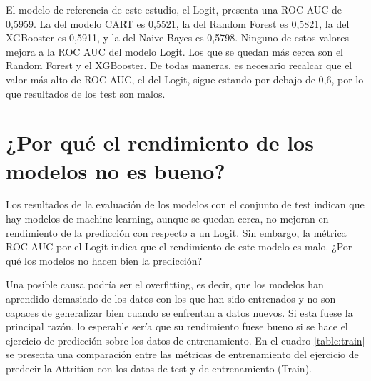 El modelo de referencia de este estudio, el Logit, presenta una ROC AUC de 0,5959. La del modelo CART es 0,5521, la del Random Forest es 0,5821, la del XGBooster es 0,5911, y la del Naive Bayes es 0,5798. Ninguno de estos valores mejora a la ROC AUC del modelo Logit. Los que se quedan más cerca son el Random Forest y el XGBooster. De todas maneras, es necesario recalcar que el valor más alto de ROC AUC, el del Logit, sigue estando por debajo de 0,6, por lo que resultados de los test son malos.

\section{¿Por qué el rendimiento de los modelos no es bueno?}

Los resultados de la evaluación de los modelos con el conjunto de test indican que hay modelos de machine learning, aunque se quedan cerca, no mejoran en rendimiento de la predicción con respecto a un Logit. Sin embargo, la métrica ROC AUC por el Logit indica que el rendimiento de este modelo es malo. ¿Por qué los modelos no hacen bien la predicción?

Una posible causa podría ser el overfitting, es decir, que los modelos han aprendido demasiado de los datos con los que han sido entrenados y no son capaces de generalizar bien cuando se enfrentan a datos nuevos. Si esta fuese la principal razón, lo esperable sería que su rendimiento fuese bueno si se hace el ejercicio de predicción sobre los datos de entrenamiento. En el cuadro \ref{table:train} se presenta una comparación entre las métricas de entrenamiento del ejercicio de predecir la Attrition con los datos de test y de entrenamiento (Train).

